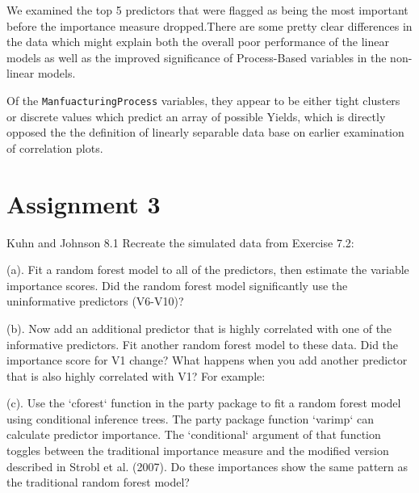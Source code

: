 \documentclass[]{report}
\begin{document}
We examined the top 5 predictors that were flagged as being the most
important before the importance measure dropped.There are some pretty
clear differences in the data which might explain both the overall poor
performance of the linear models as well as the improved significance of
Process-Based variables in the non-linear models.

Of the \texttt{ManfuacturingProcess} variables, they appear to be either
tight clusters or discrete values which predict an array of possible
Yields, which is directly opposed the the definition of linearly
separable data base on earlier examination of correlation plots.

\hypertarget{AS-3}{%
\chapter*{Assignment 3}\label{AS-3}}


\begin{question}{Kuhn and Johnson 8.1} Recreate the simulated data from Exercise 7.2: \end{question}

\begin{subquestion}{(a).} Fit a random forest model to all of the predictors, then estimate the variable importance scores. Did the random forest model significantly use the uninformative predictors (V6-V10)?\end{subquestion}

\begin{subquestion}{(b).} Now add an additional predictor that is highly correlated with one of the informative predictors. Fit another random forest model to these data. Did the importance score for V1 change? What happens when you add another predictor that is also highly correlated with V1? For example:\end{subquestion}

\begin{subquestion}{(c).} Use the `cforest` function in the party package to fit a random forest model using conditional inference trees. The party package function `varimp` can calculate predictor importance. The `conditional` argument of that function toggles between the traditional importance measure and the modified version described in Strobl et al. (2007). Do these importances show the same pattern as the traditional random forest model?\end{subquestion}
\end{document}

